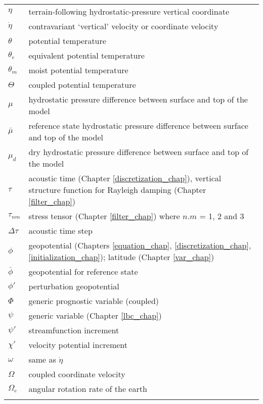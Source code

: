 \begin{tabular}{ l p{5.5in} }
$\eta$         & terrain-following hydrostatic-pressure vertical coordinate \\
$\dot\eta$     & contravariant `vertical' velocity or coordinate velocity \\
$\theta$       & potential temperature  \\
$\theta_e$     & equivalent potential temperature  \\
$\theta_m$     & moist potential temperature  \\
$\Theta$       & coupled potential temperature  \\  
$\mu$          & hydrostatic pressure difference between surface and top of the model  \\  
$\bar\mu$      & reference state hydrostatic pressure difference between surface and top of the model  \\  
$\mu_d$        & dry hydrostatic pressure difference between surface and top of the model  \\  
$\tau$         & acoustic time (Chapter \ref{discretization_chap}), vertical structure function for Rayleigh damping (Chapter \ref{filter_chap}) \\  
$\tau_{nm}$    & stress tensor (Chapter \ref{filter_chap}) where $n. m$ = 1, 2 and 3 \\  
$\Delta \tau$  & acoustic time step \\  
$\phi$         & geopotential (Chapters \ref{equation_chap}, \ref{discretization_chap}, \ref{initialization_chap}); latitude (Chapter \ref{var_chap}) \\  
$\bar \phi$    & geopotential for reference state \\  
$\phi'$        & perturbation geopotential \\  
$\Phi$         & generic prognostic variable (coupled) \\  
$\psi$         & generic variable (Chapter \ref{lbc_chap}) \\  
$\psi'$        & streamfunction increment \\  
$\chi'$        & velocity potential increment \\  
$\omega$       & same as $\dot\eta$ \\  
$\Omega$       & coupled coordinate velocity \\  
$\Omega_e$     & angular rotation rate of the earth \\  
\\
\end{tabular}

